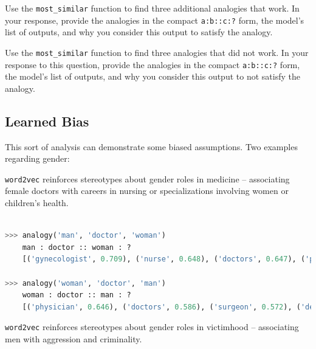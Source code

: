 \documentclass[a4paper,10pt]{article}
\begin{document}
\vspace{5pt}
\begin{taskbox}
 Use the \texttt{most\_similar} function to find three additional analogies that work. In your response, provide the analogies in the compact \texttt{a:b::c:?} form, the model's list of outputs, and why you consider this output to satisfy the analogy.

 Use the \texttt{most\_similar} function to find three analogies that did not work. In your response to this question, provide the analogies in the compact \texttt{a:b::c:?} form, the model's list of outputs, and why you consider this output to not satisfy the analogy.

\end{taskbox}
\vspace{5pt}


\subsection{Learned Bias}
This sort of analysis can demonstrate some biased assumptions. Two examples regarding gender: 

\xhdr{>} \texttt{word2vec} reinforces stereotypes about gender roles in medicine -- associating female doctors with careers in nursing or specializations involving women or children's health. 
\begin{center}
\begin{minipage}{0.95\textwidth}
\begin{lstlisting}[language=Python]

>>> analogy('man', 'doctor', 'woman')
    man : doctor :: woman : ?
    [('gynecologist', 0.709), ('nurse', 0.648), ('doctors', 0.647), ('physician', 0.644), ('pediatrician', 0.625), ('nurse_practitioner', 0.622), ('obstetrician', 0.607), ('ob_gyn', 0.599), ('midwife', 0.593), ('dermatologist', 0.574)]

>>> analogy('woman', 'doctor', 'man')
    woman : doctor :: man : ?
    [('physician', 0.646), ('doctors', 0.586), ('surgeon', 0.572), ('dentist', 0.552), ('cardiologist', 0.541), ('neurologist', 0.527), ('neurosurgeon', 0.525), ('urologist', 0.525), ('Doctor', 0.524), ('internist', 0.518)]
\end{lstlisting}
\end{minipage}
\end{center}
%

\xhdr{>} \texttt{word2vec} reinforces stereotypes about gender roles in victimhood -- associating men with aggression and criminality. 
\end{document}

